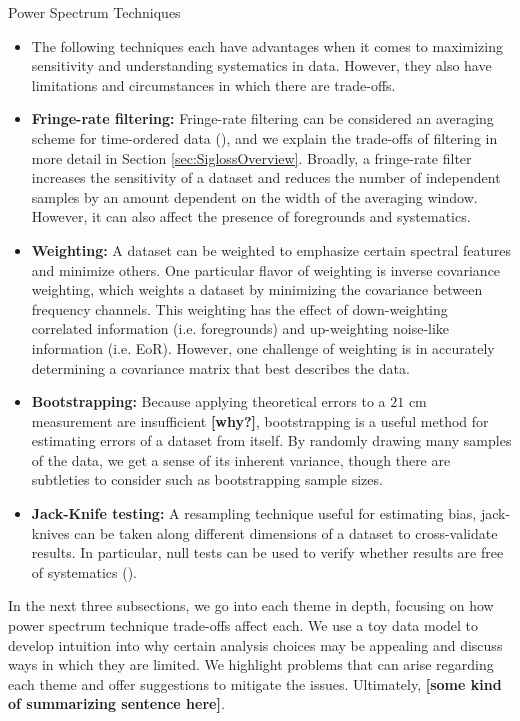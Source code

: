 \documentclass[preprint2,numberedappendix,tighten,twocolappendix]{aastex6}  %
\newcommand{\cc}[1]{{\color{purple} \textbf{[#1]}}}
\begin{document}
\begin{center}
Power Spectrum Techniques
\end{center}
\begin{itemize}
\item[] The following techniques each have advantages when it comes to maximizing sensitivity and understanding systematics in data. However, they also have limitations and circumstances in which there are trade-offs.
\item \textbf{Fringe-rate filtering:} Fringe-rate filtering can be considered an averaging scheme for time-ordered data (\citealt{parsons_et_al2016}), and we explain the trade-offs of filtering in more detail in Section \ref{sec:SiglossOverview}. Broadly, a fringe-rate filter increases the sensitivity of a dataset and reduces the number of independent samples by an amount dependent on the width of the averaging window. However, it can also affect the presence of foregrounds and systematics. 
\item \textbf{Weighting:} A dataset can be weighted to emphasize certain spectral features and minimize others. One particular flavor of weighting is inverse covariance weighting, which weights a dataset by minimizing the covariance between frequency channels. This weighting has the effect of down-weighting correlated information (i.e. foregrounds) and up-weighting noise-like information (i.e. EoR). However, one challenge of weighting is in accurately determining a covariance matrix that best describes the data.
\item \textbf{Bootstrapping:} Because applying theoretical errors to a $21$ cm measurement are insufficient \cc{why?}, bootstrapping is a useful method for estimating errors of a dataset from itself. By randomly drawing many samples of the data, we get a sense of its inherent variance, though there are subtleties to consider such as bootstrapping sample sizes.
\item \textbf{Jack-Knife testing:} A resampling technique useful for estimating bias, jack-knives can be taken along different dimensions of a dataset to cross-validate results. In particular, null tests can be used to verify whether results are free of systematics (\citealt{keating_et_al2016}).
\end{itemize}

In the next three subsections, we go into each theme in depth, focusing on how power spectrum technique trade-offs affect each. We use a toy data model to develop intuition into why certain analysis choices may be appealing and discuss ways in which they are limited. We highlight problems that can arise regarding each theme and offer suggestions to mitigate the issues. Ultimately, \cc{some kind of summarizing sentence here}.
\end{document}
